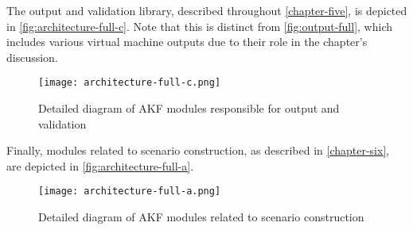 The output and validation library, described throughout \autoref{chapter-five}, is depicted in
\autoref{fig:architecture-full-c}. Note that this is distinct from
\autoref{fig:output-full}, which includes various virtual machine
outputs due to their role in the chapter's discussion.

\begin{figure}[htbp]
\centering
\texttt{[image: architecture-full-c.png]}
\caption{Detailed diagram of AKF modules responsible for output and
validation}\label{fig:architecture-full-c}
\end{figure}

Finally, modules related to scenario construction, as described in
\autoref{chapter-six}, are depicted in
\autoref{fig:architecture-full-a}.

\begin{figure}[htbp]
\centering
\texttt{[image: architecture-full-a.png]}
\caption{Detailed diagram of AKF modules related to scenario
construction}\label{fig:architecture-full-a}
\end{figure}
